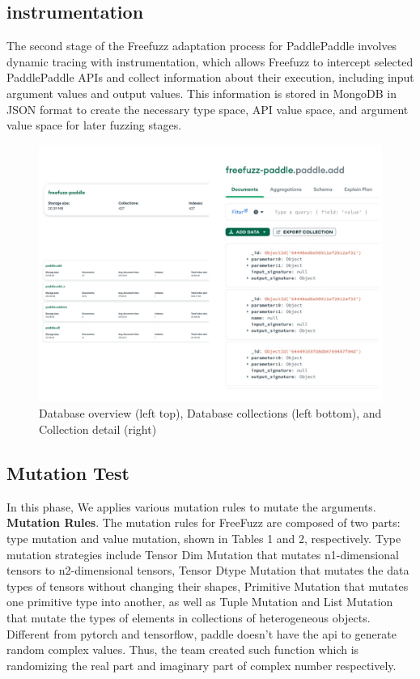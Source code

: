 \documentclass[sigconf]{acmart}
\begin{document}
  \subsection{instrumentation}
  \par The second stage of the Freefuzz adaptation process for PaddlePaddle involves dynamic tracing with instrumentation, 
  which allows Freefuzz to intercept selected PaddlePaddle APIs and collect information about their execution, 
  including input argument values and output values. This information is stored in MongoDB in JSON format to create the necessary type space, 
  API value space, and argument value space for later fuzzing stages.


  
  \begin{figure}[h]
    \centering
    \includegraphics[width=\linewidth]{3.png}
    \caption{Database overview (left top), Database collections (left bottom), and Collection detail (right)}
  \end{figure}
  
  \subsection{Mutation Test}

  In this phase, We applies various mutation rules to mutate the arguments.\cite{w1}
  \newline \textbf{Mutation Rules}. The mutation rules for FreeFuzz are composed
  of two parts: type mutation and value mutation, shown in Tables 1
  and 2, respectively. Type mutation strategies include Tensor Dim
  Mutation that mutates n1-dimensional tensors to n2-dimensional
  tensors, Tensor Dtype Mutation that mutates the data types of tensors without changing their shapes, Primitive Mutation that mutates
  one primitive type into another, as well as Tuple Mutation and List
  Mutation that mutate the types of elements in collections of heterogeneous objects.\cite{w1}
  \newline Different from pytorch and tensorflow, paddle doesn't have the api to generate random complex values. Thus, the team
  created such function which is randomizing the real part and imaginary part of complex number respectively.
 
\end{document}
